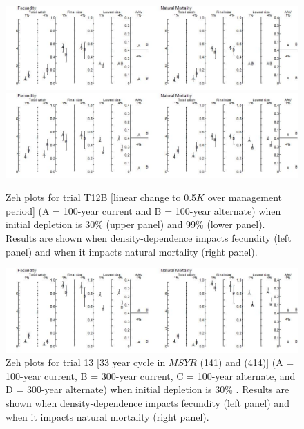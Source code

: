 \documentclass{article}\usepackage[]{graphicx}\usepackage[]{color}
\providecommand\phantomsection{}
\begin{document}
\begin{landscape}
\begin{figure}[H]
\centering
\includegraphics[]{SC66aRMP10_Part2_T12B-R.jpeg}
\includegraphics[]{SC66aRMP10_Part2_T12B-D.jpeg}
\caption{
Zeh plots for trial T12B
[linear change to 0.5$K$ over management period]
(A = 100-year current and B = 100-year alternate)
when initial depletion is 30\% (upper panel) and 99\% (lower panel).
Results are shown when density-dependence impacts fecundity (left panel) and when it impacts natural mortality (right panel).
}
\end{figure}

\phantomsection
{}
\setcounter{figure}{0}


\begin{figure}[H]
\centering
\includegraphics[]{SC66aRMP10_Part2_T13B-R.jpeg}
\caption{
Zeh plots for trial 13
[33 year cycle in $MSYR$ (141) and (414)]
(A = 100-year current, B = 300-year current, C = 100-year alternate, and D = 300-year alternate)
when initial depletion is 30\% .%
Results are shown when density-dependence impacts fecundity (left panel) and when it impacts natural mortality (right panel).
}
\end{figure}


\end{landscape}
\end{document}
